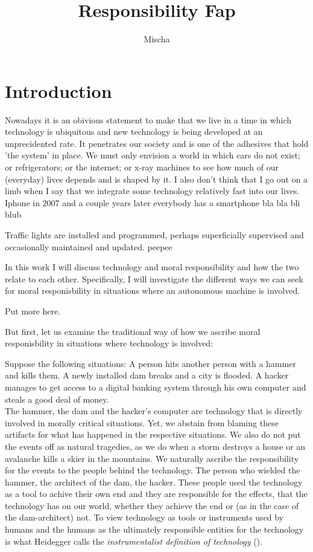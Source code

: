\documentclass{article}
\title{Responsibility Fap}
\author{Mischa}
\begin{document}
\begin{titlepage}
	\maketitle
\end{titlepage}
\tableofcontents
\newpage
\section{Introduction}

Nowadays it is an obivious statement to make that we live in a time in which
technology is ubiquitous and new technology is being developed at an
unprecidented rate. It penetrates our society and is one of the adhesives that
hold 'the system' in place. We must only envision a world in which cars do not
exist; or refrigerators; or the internet; or x-ray machines to see how much of
our (everyday) lives depends and is shaped by it. I also don't think that I go
out on a limb when I say that we integrate some technology relatively fast into
our lives. Iphone in 2007 and a couple years later everybody has a smartphone
bla bla bli blub


Traffic lights are installed and programmed, perhaps superficially supervised
and occasionally maintained and updated. peepee

In this work I will discuss technology and moral responsibility and how the two
relate to each other. Specifically, I will investigate the different ways we can seek
for moral responisbility in situations where an autonomous machine is involved.

Put more here.

But first, let us examine the traditional way of how we ascribe moral
responisbility in situations where technology is involved:

Suppose the following situations: A person hits another person with a hammer and
kills them. A newly installed dam breaks and a city is flooded. A hacker manages
to get access to a digital banking system through his own computer and steals a
good deal of money.\\

The hammer, the dam and the hacker's computer are technology that is directly
involved in morally critical situations. Yet, we abstain from blaming these
artifacts for what has happened in the respective situations. We also do not put
the events off as natural tragedies, as we do when a storm destroys a house or
an avalanche kills a skier in the mountains. We naturally ascribe the
responsibility for the events to the people behind the technology.
The person who wielded the hammer, the architect of the dam, the hacker.
These people used the technology as a tool to achive their own end and they are
responsible for the effects, that the technology has on our world, whether they
achieve the end or (as in the case of the dam-architect) not.
To view technology as tools or instruments used by humans and the humans as the ultimately
responsible entities for the technology is what Heidegger calls the \textit{instrumentalist
definition of technology} (\cite{heidegger1977technology}). 
\end{document}
